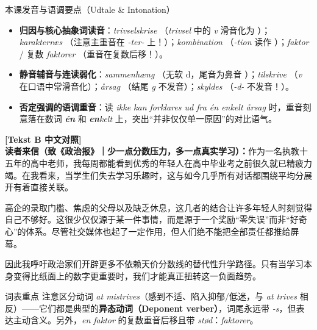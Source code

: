 \begin{tipbox}{本课发音与语调要点（Udtale \& Intonation）}
\begin{itemize}
  \item \textbf{归因与核心抽象词读音}：\textit{trivselskrise} （\textit{trivsel} 中的 \textit{v} 滑音化为 ）；\textit{karakterræs} （注意主重音在 \textit{-ter-} 上！）；\textit{kombination} （\textit{-tion} 读作 ）；\textit{faktor}  / 复数 \textit{faktorer} （重音在复数后移！）。
  \item \textbf{静音辅音与连读弱化}：\textit{sammenhæng} （无软 d，尾音为鼻音 ）；\textit{tilskrive} （\textit{v} 在口语中常滑音化）；\textit{årsag} （结尾 \textit{g} 不发音）；\textit{skyldes} （\textit{-d-} 不发音！）。
  \item \textbf{否定强调的语调重音}：读 \textit{ikke kan forklares ud fra én enkelt årsag} 时，重音刻意落在数词 \textit{\textbf{én}}  和 \textit{\textbf{en}kelt} 上，突出“并非仅仅单一原因”的对比语气。
\end{itemize}
\end{tipbox}

\begin{transbox}
\small
\textbf{\color{NCDTeal}[Tekst B 中文对照]}\\
\textbf{读者来信（致《政治报》｜少一点分数压力，多一点真实学习）：}作为一名执教十五年的高中老师，我每周都能看到优秀的年轻人在高中毕业考之前很久就已精疲力竭。在我看来，当学生们失去学习乐趣时，这与如今几乎所有对话都围绕平均分展开有着直接关联。

高企的录取门槛、焦虑的父母以及缺乏休息，这几者的结合让许多年轻人时刻觉得自己不够好。这很少仅仅源于某一件事情，而是源于一个奖励“零失误”而非“好奇心”的体系。尽管社交媒体也起了一定作用，但人们绝不能把全部责任都推给屏幕。

因此我呼吁政治家们开辟更多不依赖天价分数线的替代性升学路径。只有当学习本身变得比纸面上的数字更重要时，我们才能真正扭转这一负面趋势。
\end{transbox}


\begin{tipbox}{词表重点}
注意区分动词 \textit{at mistrives}（感到不适、陷入抑郁/低迷，与 \textit{at trives} 相反）——它们都是典型的\textbf{异态动词（Deponent verber）}，词尾永远带 \textit{-s}，但表达主动含义。另外，\textit{en faktor} 的复数重音后移且带 \textit{stød}：\textit{faktorer}。
\end{tipbox}

